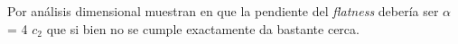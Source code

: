 Por análisis dimensional muestran en \cite{falconObservationIntermittencyWave2007} que la pendiente del \textit{flatness} debería ser $\alpha$ = 4 $c_2$ que si bien no se cumple exactamente da bastante cerca. 





